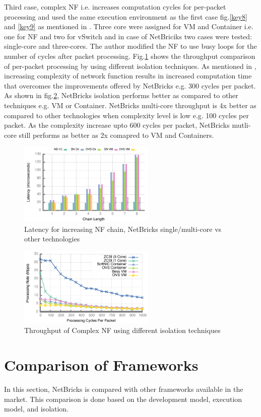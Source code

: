 \documentclass[10pt, a4paper, conference]{IEEEtran}
\begin{document}
Third case, complex NF i.e. increases computation cycles for per-packet processing and used the same execution environment as the first case fig.\ref{key8} and \ref{key9} as mentioned in \cite{Panda2016}. Three core were assigned for VM and Container i.e. one for NF and two for vSwitch and in case of NetBriciks two cases were tested\cite{Panda2016}: single-core and three-cores. The author modified the NF to use busy loops for the number of cycles after packet processing. Fig.\ref{key14} shows the throughput comparison of per-packet processing by using different isolation techniques. As mentioned in \cite{Panda2016}, increasing complexity of network function results in increased computation time that overcomes the improvements offered by NetBricks e.g. 300 cycles per packet. As shown in fig.\ref{key15}, NetBricks isolation performs better as compared to other techniques e.g. VM or Container. NetBricks multi-core throughput is 4x better as compared to other technologies when complexity level is low e.g. 100 cycles per packet. As the complexity increase upto 600 cycles per packet, NetBricks mutli-core still performs as better as 2x comapred to VM and Containers.  
\begin{figure}
	\centering
	\includegraphics[width=65mm]{figures/fig12}
	\caption{Latency for increasing NF chain, NetBricks single/multi-core vs other technologies\cite{Panda2016}}
	\label{key14}
\end{figure}
\begin{figure}
	\centering
	\includegraphics[width=65mm]{figures/fig13}
	\caption{Throughput of Complex NF using different isolation techniques\cite{Panda2016}}
	\label{key15}
\end{figure}
\section{Comparison of Frameworks}
In this section, NetBricks is compared with other frameworks available in the market. This comparison is done based on the development model, execution model, and isolation.
\end{document}
